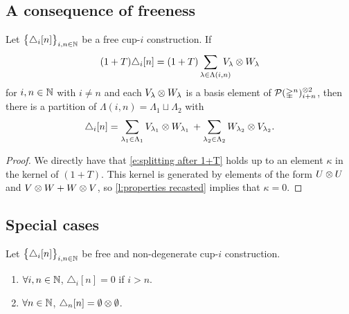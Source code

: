 \subsection{A consequence of freeness}

\begin{lemma} \label{l:splitting of summands}
	Let $\big\{ \triangle_i [n] \big\}_{i,n\in\mathbb{N}}$ be a free cup-$i$ construction.
	If
	\[
	(1+T) \triangle_i [n] =
	(1+T) \sum_{\lambda \in \Lambda(i,n) \kern-10pt} V_\lambda \ot W_\lambda
	\]
	for $i,n \in \mathbb{N}$ with $i \neq n$ and each $V_\lambda \otimes W_\lambda$ is a basis element of $\mathcal{P}(\mathbb{\Delta}^n)^{\otimes 2}_{i+n}$, then there is a partition of $\Lambda(i,n) = \Lambda_1 \sqcup \Lambda_2$ with
	\begin{equation} \label{e:splitting after 1+T}
	\triangle_i [n] =
	\sum_{\lambda_1 \in \Lambda_1} V_{\lambda_1} \otimes W_{\lambda_1} \, +
	\sum_{\lambda_2 \in \Lambda_2} W_{\lambda_2} \otimes V_{\lambda_2}.
	\end{equation}
\end{lemma}

\begin{proof}
	We directly have that \eqref{e:splitting after 1+T} holds up to an element $\kappa$ in the kernel of $(1+T)$.
	This kernel is generated by elements of the form $U \otimes U$ and $V \otimes W + W \otimes V$, so \cref{l:properties recasted} implies that $\kappa = 0$.
\end{proof}

\subsection{Special cases}

\begin{lemma} \label{l:special case one}
	Let $\big\{ \triangle_i [n] \big\}_{i,n\in\mathbb{N}}$ be free and non-degenerate cup-$i$ construction.
	\begin{enumerate}
		\item $\forall i,n \in \mathbb{N}$, $\triangle_i[n] = 0$ if $i > n$.
		\item $\forall n \in \mathbb{N}$, $\triangle_n[n] = \emptyset \otimes \emptyset$.
	\end{enumerate}
\end{lemma}

